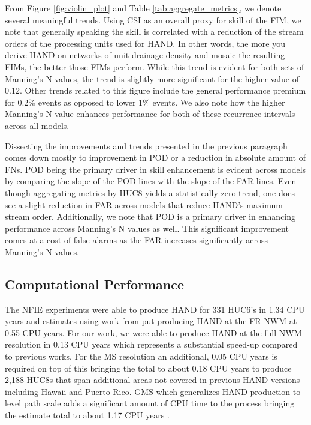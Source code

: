 From Figure \ref{fig:violin_plot} and Table \ref{tab:aggregate_metrics}, we denote several meaningful trends. 
Using CSI as an overall proxy for skill of the FIM, we note that generally speaking the skill is correlated with a reduction of the stream orders of the processing units used for HAND.
In other words, the more you derive HAND on networks of unit drainage density and mosaic the resulting FIMs, the better those FIMs perform.
While this trend is evident for both sets of Manning's N values, the trend is slightly more significant for the higher value of 0.12.
Other trends related to this figure include the general performance premium for 0.2\% events as opposed to lower 1\% events.
We also note how the higher Manning's N value enhances performance for both of these recurrence intervals across all models.

Dissecting the improvements and trends presented in the previous paragraph comes down mostly to improvement in POD or a reduction in absolute amount of FNs.
POD being the primary driver in skill enhancement is evident across models by comparing the slope of the POD lines with the slope of the FAR lines.
Even though aggregating metrics by HUC8 yields a statistically zero trend, one does see a slight reduction in FAR across models that reduce HAND's maximum stream order.
Additionally, we note that POD is a primary driver in enhancing performance across Manning's N values as well.
This significant improvement comes at a cost of false alarms as the FAR increases significantly across Manning's N values.
%
\subsection{Computational Performance}
\label{ssec:compuational_performance}
%
The NFIE experiments were able to produce HAND for 331 HUC6's in 1.34 CPU years and estimates using work from  put producing HAND at the FR NWM at 0.55 CPU years. 
For our work, we were able to produce HAND at the full NWM resolution in 0.13 CPU years which represents a substantial speed-up compared to previous works.
For the MS resolution an additional, 0.05 CPU years is required on top of this bringing the total to about 0.18 CPU years to produce 2,188 HUC8s that span additional areas not covered in previous HAND versions including Hawaii and Puerto Rico.
GMS which generalizes HAND production to level path scale adds a significant amount of CPU time to the process bringing the estimate total to about 1.17 CPU years .
%
